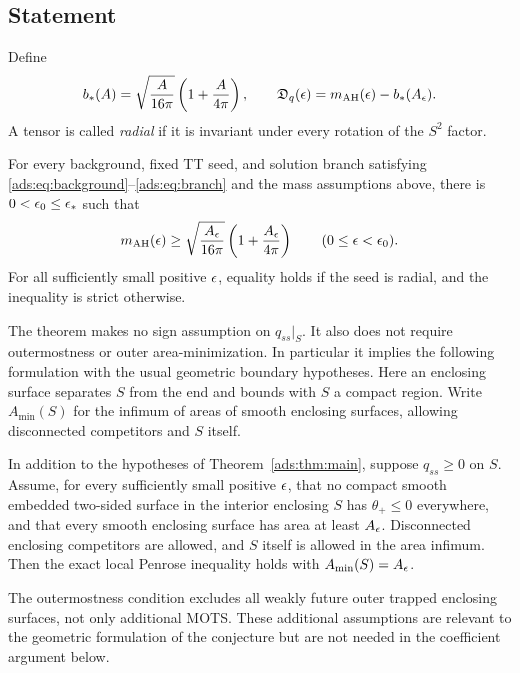 \subsection{Statement}

Define
\begin{equation}\label{ads:eq:deficit}
 b_*(A)=\sqrt{\frac A{16\pi}}\left(1+\frac A{4\pi}\right),
 \qquad
 \mathfrak D_q(\epsilon)=m_{\mathrm{AH}}(\epsilon)-b_*(A_\epsilon).
\end{equation}
A tensor is called \emph{radial} if it is invariant under every
rotation of the $S^2$ factor.

\begin{theorem}\label{ads:thm:main}
For every background, fixed TT seed, and solution branch satisfying
\eqref{ads:eq:background}--\eqref{ads:eq:branch} and the mass assumptions
above, there is $0<\epsilon_0\leq\epsilon_*$ such that
\[
 m_{\mathrm{AH}}(\epsilon)\geq
 \sqrt{\frac{A_\epsilon}{16\pi}}\left(1+\frac{A_\epsilon}{4\pi}\right)
 \qquad(0\leq\epsilon<\epsilon_0).
\]
For all sufficiently small positive $\epsilon$, equality holds if the
seed is radial, and the inequality is strict otherwise.
\end{theorem}

The theorem makes no sign assumption on $q_{ss}|_S$.
It also does not require outermostness or outer area-minimization.
In particular it implies the following formulation with the usual
geometric boundary hypotheses. Here an enclosing surface separates $S$
from the end and bounds with $S$ a compact region. Write $A_{\min}(S)$
for the infimum of areas of smooth enclosing surfaces, allowing
disconnected competitors and $S$ itself.

\begin{corollary}\label{ads:cor:penrose}
In addition to the hypotheses of Theorem~\ref{ads:thm:main}, suppose
$q_{ss}\geq0$ on $S$. Assume, for every sufficiently small positive
$\epsilon$, that no compact smooth embedded two-sided surface in the
interior enclosing $S$ has $\theta_+\leq0$ everywhere, and that
every smooth enclosing surface has area at least $A_\epsilon$.
Disconnected enclosing competitors are allowed, and $S$ itself is
allowed in the area infimum. Then the exact local Penrose inequality
holds with $A_{\min}(S)=A_\epsilon$.
\end{corollary}

The outermostness condition excludes
all weakly future outer trapped enclosing surfaces, not only
additional MOTS. These additional assumptions are relevant to the
geometric formulation of the conjecture but are not needed in the
coefficient argument below.


